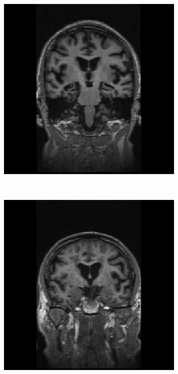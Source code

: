 \documentclass[10pt,twoside]{book}
\begin{document}
\begin{figure}
  \centering
  \begin{subfigure}{0.4\textwidth}
    \centering
    \includegraphics[width=\textwidth]{orig01}
    \caption{}
    \label{fig:labelPropagation_a}
  \end{subfigure}
  \\[2ex]
  \begin{subfigure}{0.4\textwidth}
    \centering
    \includegraphics[width=\textwidth]{orig03}

\end{subfigure}
\end{figure}
\end{document}
